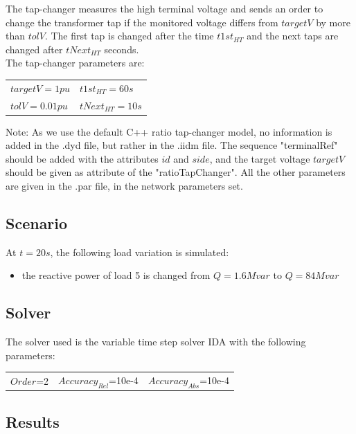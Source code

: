\documentclass[a4paper, 12pt]{report}
\begin{document}
The tap-changer measures the high terminal voltage and sends an order to change the transformer tap if the monitored voltage differs from $targetV$ by more than $tolV$. The first tap is changed after the time $t1st_{HT}$ and the next taps are changed after $tNext_{HT}$ seconds.\\

The tap-changer parameters are:
\begin{center}
\begin{tabular}{l|l}
   $targetV=1pu$ & $t1st_{HT}=60s$ \\
   $tolV=0.01pu$  & $tNext_{HT}=10s$ \\
\end{tabular}
\end{center}

Note: As we use the default C++ ratio tap-changer model, no information is added in the .dyd file, but rather in the .iidm file. The sequence "terminalRef" should be added with the attributes $id$ and $side$, and the target voltage $targetV$ should be given as attribute of the "ratioTapChanger". All the other parameters are given in the .par file, in the network parameters set.

\subsection{Scenario}
At $t=20s$, the following load variation is simulated:
\begin{itemize}
\item{the reactive power of load 5 is changed from $Q=1.6Mvar$ to $Q=84Mvar$}
\end{itemize}

\subsection{Solver}
The solver used is the variable time step solver IDA with the following parameters:
\begin{center}
\begin{tabular}{l|l|l}
   $Order$=2 & $Accuracy_{Rel}$=10e-4 & $Accuracy_{Abs}$=10e-4 \\
\end{tabular}
\end{center}

\subsection{Results}
\end{document}
